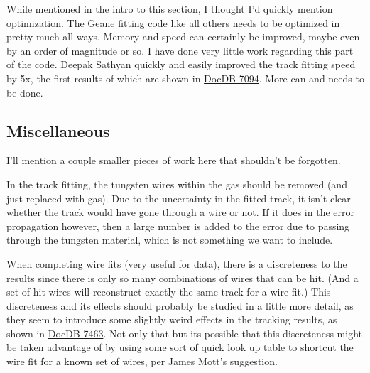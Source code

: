 		While mentioned in the intro to this section, I thought I'd quickly mention optimization. The Geane fitting code like all others needs to be optimized in pretty much all ways. Memory and speed can certainly be improved, maybe even by an order of magnitude or so. I have done very little work regarding this part of the code. Deepak Sathyan quickly and easily improved the track fitting speed by 5x, the first results of which are shown in \href{https://gm2-docdb.fnal.gov/cgi-bin/private/ShowDocument?docid=7094}{DocDB 7094}. More can and needs to be done.

	\subsection{Miscellaneous}

		I'll mention a couple smaller pieces of work here that shouldn't be forgotten.

		In the track fitting, the tungsten wires within the gas should be removed (and just replaced with gas). Due to the uncertainty in the fitted track, it isn't clear whether the track would have gone through a wire or not. If it does in the error propagation however, then a large number is added to the error due to passing through the tungsten material, which is not something we want to include.

		When completing wire fits (very useful for data), there is a discreteness to the results since there is only so many combinations of wires that can be hit. (And a set of hit wires will reconstruct exactly the same track for a wire fit.)  This discreteness and its effects should probably be studied in a little more detail, as they seem to introduce some slightly weird effects in the tracking results, as shown in \href{https://gm2-docdb.fnal.gov/cgi-bin/private/ShowDocument?docid=7463}{DocDB 7463}. Not only that but its possible that this discreteness might be taken advantage of by using some sort of quick look up table to shortcut the wire fit for a known set of wires, per James Mott's suggestion.


